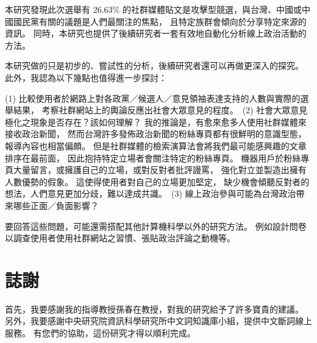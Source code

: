 \documentclass[a4paper, 10pt, conference]{ieeeconf}       %
\begin{document}
\begin{CJK}{UTF8}{bsmi}
本研究發現此次選舉有 26.63\% 的社群媒體貼文是攻擊型競選，與台灣、中國或中國國民黨有關的議題是人們最關注的焦點，%
且特定族群會傾向於分享特定來源的資訊。%
同時，本研究也提供了後續研究者一套有效地自動化分析線上政治活動的方法。%

本研究做的只是初步的、嘗試性的分析，後續研究者還可以再做更深入的探究。%
此外，我認為以下幾點也值得進一步探討：%

(1) 比較使用者於網路上對各政黨／候選人／意見領袖表達支持的人數與實際的選舉結果，%
考察社群網站上的輿論反應出社會大眾意見的程度。%
\,(2) 社會大眾意見極化之現象是否存在？該如何理解？%
我的推論是，有愈來愈多人使用社群媒體來接收政治新聞，%
然而台灣許多發佈政治新聞的粉絲專頁都有很鮮明的意識型態，報導內容也相當偏頗。%
但是社群媒體的檢索演算法會將我們最可能感興趣的文章排序在最前面，%
因此抱持特定立場者會關注特定的粉絲專頁。%
機器用戶於粉絲專頁大量留言，或擁護自己的立場，或對反對者批評謾罵，%
強化對立並製造出擁有人數優勢的假象。%
這使得使用者對自己的立場更加堅定，%
缺少機會傾聽反對者的想法，人們意見更加分歧，難以達成共識。%
\,(3) 線上政治參與可能為台灣政治帶來哪些正面／負面影響？%

要回答這些問題，可能還需搭配其他計算機科學以外的研究方法。%
例如設計問卷以調查使用者使用社群網站之習慣、張貼政治評論之動機等。%


\section*{誌謝}

首先，我要感謝我的指導教授孫春在教授，對我的研究給予了許多寶貴的建議。%
另外，我要感謝中央研究院資訊科學研究所中文詞知識庫小組，提供中文斷詞線上服務。%
有您們的協助，這份研究才得以順利完成。%





\end{CJK}
\end{document}
